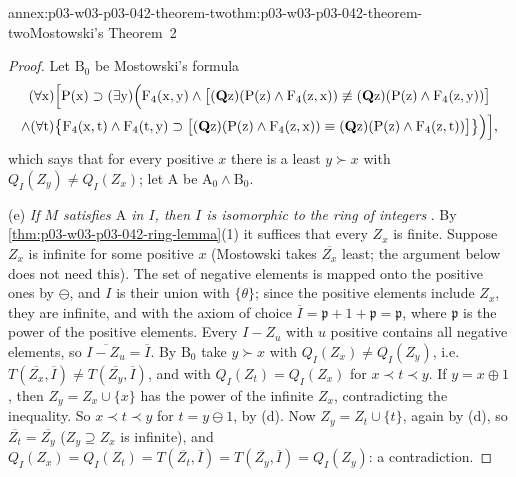 \begin{annexitem}{annex:p03-w03-p03-042-theorem-two}{thm:p03-w03-p03-042-theorem-two}{Mostowski's Theorem~2}
\begin{proof}
Let \(\mathrm B_0\) be Mostowski's formula \cite[p.~17]{Mostowski1957}
\begin{multline*}
(\forall\mathrm x)\Bigl[\mathrm P(\mathrm x)\supset(\exists\mathrm y)\Bigl(
 \mathrm F_4(\mathrm x,\mathrm y)\wedge\bigl[(\mathbf Q\mathrm z)(\mathrm
 P(\mathrm z)\wedge\mathrm F_4(\mathrm z,\mathrm x))\not\equiv(\mathbf
 Q\mathrm z)(\mathrm P(\mathrm z)\wedge\mathrm F_4(\mathrm z,\mathrm
 y))\bigr]\\
 \wedge(\forall\mathrm t)\bigl\{\mathrm F_4(\mathrm x,\mathrm t)\wedge
 \mathrm F_4(\mathrm t,\mathrm y)\supset\bigl[(\mathbf Q\mathrm z)(\mathrm
 P(\mathrm z)\wedge\mathrm F_4(\mathrm z,\mathrm x))\equiv(\mathbf
 Q\mathrm z)(\mathrm P(\mathrm z)\wedge\mathrm F_4(\mathrm z,\mathrm t))
 \bigr]\bigr\}\Bigr)\Bigr],
\end{multline*}
which says that for every positive \(x\) there is a least \(y\succ x\)
with \(Q_I(Z_y)\neq Q_I(Z_x)\); let \(\mathrm A\) be \(\mathrm A_0\wedge
\mathrm B_0\).

(e) \emph{If \(M\) satisfies \(\mathrm A\) in \(I\), then \(I\) is
isomorphic to the ring of integers} \cite[p.~18]{Mostowski1957}.  By
\cref{thm:p03-w03-p03-042-ring-lemma}(1) it suffices that every \(Z_x\)
is finite.  Suppose \(Z_x\) is infinite for some positive \(x\)
(Mostowski takes \(\overline{Z_x}\) least; the argument below does not
need this).  The set of negative elements is mapped onto the positive ones
by \(\ominus\), and \(I\) is their union with \(\{\theta\}\); since the
positive elements include \(Z_x\), they are infinite, and with the axiom
of choice \(\overline I=\mathfrak p+1+\mathfrak p=\mathfrak p\), where
\(\mathfrak p\) is the power of the positive elements.  Every \(I-Z_u\)
with \(u\) positive contains all negative elements, so
\(\overline{I-Z_u}=\overline I\).  By \(\mathrm B_0\) take \(y\succ x\)
with \(Q_I(Z_x)\neq Q_I(Z_y)\), i.e.\ \(T(\overline{Z_x},\overline I)\neq
T(\overline{Z_y},\overline I)\), and with \(Q_I(Z_t)=Q_I(Z_x)\) for
\(x\prec t\prec y\).  If \(y=x\oplus1\), then \(Z_y=Z_x\cup\{x\}\) has the
power of the infinite \(Z_x\), contradicting the inequality.  So
\(x\prec t\prec y\) for \(t=y\ominus1\), by (d).  Now \(Z_y=Z_t\cup\{t\}\),
again by (d), so \(\overline{Z_t}=\overline{Z_y}\) (\(Z_y\supseteq Z_x\) is
infinite), and \(Q_I(Z_x)=Q_I(Z_t)=T(\overline{Z_t},\overline I)=
T(\overline{Z_y},\overline I)=Q_I(Z_y)\): a contradiction.


\end{proof}
\end{annexitem}
